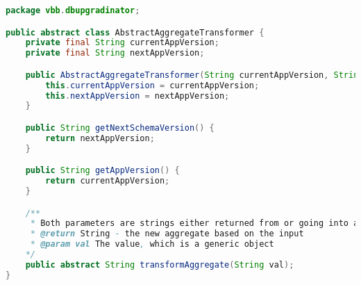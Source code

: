 \begin{lstlisting}[language=Java, label=ag, caption={Klassen \emph{AbstractAggregateTransformer}, hvis hovedansvar er å lage en ny streng ut fra et gitt strengargument i funksjonen \emph{transformAggregate}, som programvareutvikleren selv må implementere.}]
package vbb.dbupgradinator;

public abstract class AbstractAggregateTransformer {
    private final String currentAppVersion;
    private final String nextAppVersion;

    public AbstractAggregateTransformer(String currentAppVersion, String nextAppVersion) {
        this.currentAppVersion = currentAppVersion;
        this.nextAppVersion = nextAppVersion;
    }

    public String getNextSchemaVersion() {
        return nextAppVersion;
    }

    public String getAppVersion() {
        return currentAppVersion;
    }

    /**
     * Both parameters are strings either returned from or going into a DB query
     * @return String - the new aggregate based on the input
     * @param val The value, which is a generic object
    */
    public abstract String transformAggregate(String val);
}
\end{lstlisting}

